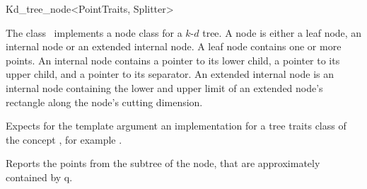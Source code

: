 

\begin{ccRefClass}{Kd_tree_node<PointTraits, Splitter>}  %


\begin{ccAdvanced}

\ccDefinition
  
The class \ccRefName\ implements a node class for a $k$-$d$ tree. 
A node is either a leaf node, an internal node or an extended internal node.
A leaf node contains one or more points. An internal node contains a pointer
to its lower child, a pointer to its upper child, and a pointer to its separator.
An extended internal node is an internal node containing the lower and 
upper limit of an extended node's rectangle
along the node's cutting dimension.



Expects for the template argument an implementation for a tree traits class
of the concept ,
for example .

\ccTypes




\ccCreation
{}  %



\ccOperations

{Reports the points from the subtree of the node, that are approximately contained by q.} 


\end{ccAdvanced}
\end{ccRefClass}
